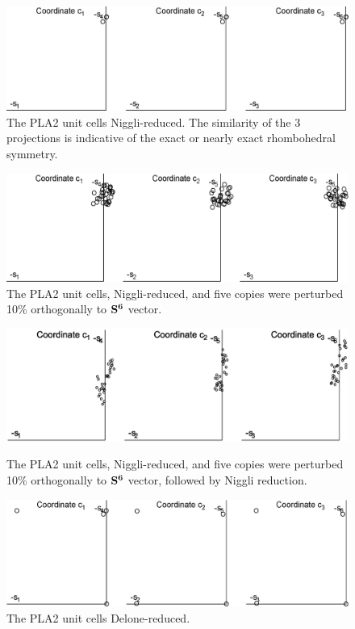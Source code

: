 \documentclass[preprint]{iucr}              %
\numberwithin{equation}{section}
\newcommand{\SVI}[0]{$\bf{S^{6}}$}
\begin{document}
	\begin{figure}
		\includegraphics[width=1.0\textwidth]{2_06}
		\caption{The PLA2 unit cells Niggli-reduced. The similarity 
			of the 3 projections is indicative of the exact or nearly
			exact rhombohedral symmetry.}
		\label{fig2}
	\end{figure}
	
\begin{figure}
	\includegraphics[width=1.0\textwidth]{5_21}
	\caption{The PLA2 unit cells, Niggli-reduced, and five copies were perturbed 10\%
		orthogonally to \SVI{} vector. }
	\label{fig5}	
\end{figure}

\begin{figure}
	\includegraphics[width=1.0\textwidth]{19_52}
	\label{19_57}
	\caption{The PLA2 unit cells, Niggli-reduced, and five copies were perturbed 10\%
		orthogonally to \SVI{} vector, followed by Niggli reduction.}
\end{figure}

	\begin{figure}
		\includegraphics[width=1.0\textwidth]{3_03}
		\caption{The PLA2 unit cells Delone-reduced. }
		\label{fig3}
	\end{figure}
	
\end{document}
